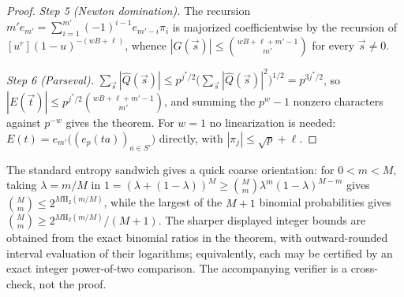 \documentclass[11pt]{article}
\theoremstyle{definition}
\theoremstyle{remark}
\newcommand{\Hb}{\mathrm{H}_2}
\begin{document}
\begin{proof}
\emph{Step 5 (Newton domination).}  The recursion $m'e_{m'}=\sum_{i=1}^{m'}(-1)^{i-1}e_{m'-i}\pi_i$ is majorized coefficientwise by the recursion of $[u^r](1-u)^{-(wB+\ell)}$, whence $|G(\vec s)|\le\binom{wB+\ell+m'-1}{m'}$ for every $\vec s\ne0$.

\emph{Step 6 (Parseval).}  $\sum_{\vec s}|\widehat Q(\vec s)|\le p^{j^*/2}\bigl(\sum_{\vec s}|\widehat Q(\vec s)|^2\bigr)^{1/2}=p^{3j^*/2}$, so $|E(\vec t)|\le p^{j^*/2}\binom{wB+\ell+m'-1}{m'}$, and summing the $p^w-1$ nonzero characters against $p^{-w}$ gives the theorem.  For $w=1$ no linearization is needed: $E(t)=e_{m'}\bigl((e_p(ta))_{a\in S'}\bigr)$ directly, with $|\pi_j|\le\sqrt p+\ell$.
\end{proof}

The standard entropy sandwich gives a quick coarse orientation: for $0<m<M$, taking $\lambda=m/M$ in $1=(\lambda+(1-\lambda))^M\ge\binom Mm\lambda^m(1-\lambda)^{M-m}$ gives $\binom Mm\le2^{M\Hb(m/M)}$, while the largest of the $M+1$ binomial probabilities gives $\binom Mm\ge2^{M\Hb(m/M)}/(M+1)$.  The sharper displayed integer bounds are obtained from the exact binomial ratios in the theorem, with outward-rounded interval evaluation of their logarithms; equivalently, each may be certified by an exact integer power-of-two comparison.  The accompanying verifier is a cross-check, not the proof.
\end{document}
